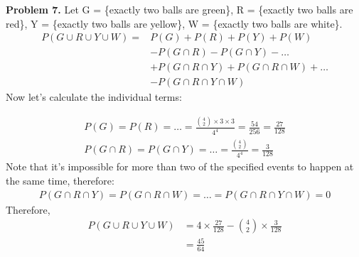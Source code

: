 \documentclass{article}
\begin{document}
\textbf{Problem 7.}
Let G = \{exactly two balls are green\}, R = \{exactly two balls are red\}, Y = \{exactly two balls are yellow\}, W = \{exactly two balls are white\}.
\begin{align}
    P(G \cup R \cup Y \cup W) = & P(G) + P(R) + P(Y) + P(W) \\
    & - P (G \cap R) - P(G \cap Y) -\dots \\
    & + P(G \cap R \cap Y) + P(G \cap R \cap W) + \dots \\
    & - P(G \cap R \cap Y \cap W)
\end{align}
Now let's calculate the individual terms:

\begin{align}
    P(G) = P(R) = \dots = \frac{{4 \choose 2} \times 3 \times 3}{4^4} = \frac{54}{256} = \frac{27}{128}\\
    P(G \cap R) = P(G \cap Y) = \dots = \frac{{4 \choose 2}}{4^4} = \frac{3 }{128}
\end{align}
Note that it's impossible for more than two of the specified events to happen at the same time, therefore:
\begin{align}
    P(G \cap R \cap Y) = P(G \cap R \cap W) = \dots = P(G \cap R \cap Y \cap W) = 0
\end{align}
Therefore,
\begin{align}
    P(G \cup R \cup Y \cup W) & = 4 \times \frac{27}{128} - {4 \choose 2} \times \frac{3}{128} \\
    & = \frac{45}{64}
\end{align}
\bigbreak
\end{document}
